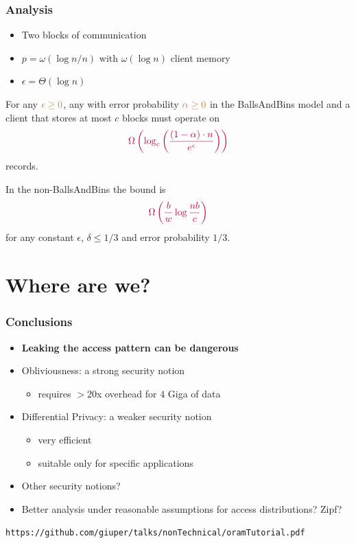 \documentclass[]{beamer}
\begin{document}
\begin{frame}
\frametitle{Analysis}
\begin{itemize}[<+->]
\item Two blocks of communication
\item $p=\omega(\log n/n)$ with $\omega(\log n)$ client memory
\item $\epsilon=\Theta(\log n)$
\end{itemize}


\pause

\begin{theorem}
For any $\color{brown}\epsilon \ge 0$, any {} with error probability $\color{brown}\alpha \ge 0$
in the BallsAndBins model and a client that stores at most $c$ blocks must operate on
$$\color{purple}
\Omega\left(\log_c \left(\frac{(1-\alpha) \cdot n}{e^\epsilon}\right)\right)
$$
records.

In the non-BallsAndBins the bound is 
$$\color{purple}
\Omega\left(\frac{b}{w}\log \frac{nb}{c}\right)
$$
for any constant $\epsilon$, $\delta\leq 1/3$ and error probability $1/3$.

\end{theorem}

\end{frame}

\section{Where are we?}
\begin{frame}
\frametitle{Conclusions}
\begin{itemize}[<+->]
\item{\color{blue} \bf Leaking the access pattern can be dangerous}
\item {\color{purple} Obliviousness}: a strong security notion
\begin{itemize}
    \item {\color{brown} requires $>20$x overhead for $4$ Giga of data}
\end{itemize}
\item {\color{purple} Differential Privacy}: a weaker security notion
\begin{itemize}
    \item {\color{brown} very efficient }
    \item {\color{brown} suitable only for specific applications}
\end{itemize}
\item Other security notions?
\item Better analysis under reasonable assumptions for access distributions?
Zipf?

\end{itemize}
\pause

\pause
{\small 
{\tt{https://github.com/giuper/talks/nonTechnical/oramTutorial.pdf}}
}
\end{frame}
\end{document}
